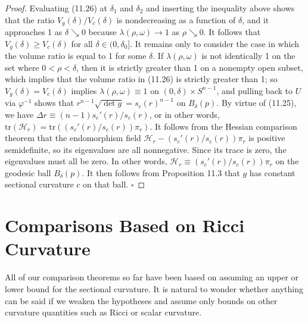 \begin{theorem}
\begin{proof}
Evaluating (11.26) at $\delta_1$ and $\delta_2$ and inserting the inequality above shows that the ratio $V_g(\delta)/V_c(\delta)$ is nondecreasing as a function of $\delta$, and it approaches 1 as $\delta \searrow 0$ because $\lambda(\rho,\omega) \to 1$ as $\rho \searrow 0$. It follows that $V_g(\delta) \ge V_c(\delta)$ for all $\delta \in (0,\delta_0]$. It remains only to consider the case in which the volume ratio is equal to 1 for some $\delta$. If $\lambda(\rho,\omega)$ is not identically 1 on the set where $0 < \rho < \delta$, then it is strictly greater than 1 on a nonempty open subset, which implies that the volume ratio in (11.26) is strictly greater than 1; so $V_g(\delta) = V_c(\delta)$ implies $\lambda(\rho,\omega) \equiv 1$ on $(0,\delta) \times S^{n-1}$, and pulling back to $U$ via $\varphi^{-1}$ shows that $r^{n-1}\sqrt{\det g} = s_c(r)^{n-1}$ on $B_\delta(p)$. By virtue of (11.25), we have $\Delta r \equiv (n-1)s_c'(r)/s_c(r)$, or in other words, $\text{tr}(\mathcal{H}_r) = \text{tr}((s_c'(r)/s_c(r))\pi_r)$. It follows from the Hessian comparison theorem that the endomorphism field $\mathcal{H}_r - (s_c'(r)/s_c(r))\pi_r$ is positive semidefinite, so its eigenvalues are all nonnegative. Since its trace is zero, the eigenvalues must all be zero. In other words, $\mathcal{H}_r \equiv (s_c'(r)/s_c(r))\pi_r$ on the geodesic ball $B_\delta(p)$. It then follows from Proposition 11.3 that $g$ has constant sectional curvature $c$ on that ball. \quad $\square$
\end{proof}
\end{theorem}

\section{Comparisons Based on Ricci Curvature}

All of our comparison theorems so far have been based on assuming an upper or lower bound for the sectional curvature. It is natural to wonder whether anything can be said if we weaken the hypotheses and assume only bounds on other curvature quantities such as Ricci or scalar curvature.

